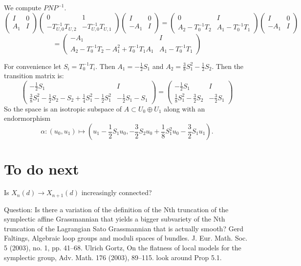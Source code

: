 {We compute $P N P^{-1}$.
$$
  \begin{pmatrix}
     I & 0\\
    A_1 &      I   \end{pmatrix}
  \begin{pmatrix}
  0 & 1 \\
 -T^{-1}_{U,0}T_{U,2} & -T^{-1}_{U,0}T_{U,1} 
  \end{pmatrix}
  \begin{pmatrix}
     I & 0 \\
    -A_1 &      I   \end{pmatrix} =
  \begin{pmatrix}
    0 & I \\
A_2 - T_0^{-1} T_2 & A_1 - T_0^{-1} T_1 
  \end{pmatrix}
  \begin{pmatrix}
     I & 0 \\
    -A_1 &      I   \end{pmatrix}  
  $$
  $$
  = \begin{pmatrix}
    -A_1 & I \\
A_2 - T_0^{-1} T_2 - A_1^2 + T_0^{-1} T_1 A_1    & A_1 - T_0^{-1} T_1
  \end{pmatrix}
  $$

  For convenience let $S_i = T_0^{-1} T_i$.
  Then $A_1 = - \frac 1 2 S_1$ and $A_2 = \frac 3 8 S_1^2 - \frac 1 2 S_2$.
  Then the transition matrix is:
 $$
 \begin{pmatrix}
    - \frac 1 2 S_1  & I \\ 
    \frac 3 8 S_1^2 - \frac 1 2 S_2 - S_2 + \frac 1 4 S_1^2 - \frac 1 2 S_1^2 & - \frac 1 2 S_1 - S_1 
 \end{pmatrix}
 = 
 \begin{pmatrix}
    - \frac 1 2 S_1  & I \\ 
    \frac 1 8 S_1^2 - \frac 3 2 S_2 &  - \frac 3 2 S_1
 \end{pmatrix}
 $$
 So the space is an isotropic subspace of $A \subset U_0 \oplus U_1$ along with an endormorphism
 $$\alpha:  (u_0, u_1) \mapsto (u_1 -\frac 1 2 S_1 u_0, -\frac 3 2 S_2 u_0 + \frac 1 8 S_1^2 u_0 - \frac 3 2 S_1 u_1).
$$
 
\section{To do next}


Is $X_n(d) \rightarrow X_{n+1}(d)$ increasingly connected?


Question: Is there a variation of the definition of the Nth truncation of the symplectic affine Grassmannian that yields a bigger subvariety of the Nth truncation of the Lagrangian Sato Grassmannian that is actually smooth?
Gerd Faltings, Algebraic loop groups and moduli spaces of bundles. J. Eur. Math. Soc. 5 (2003), no. 1, pp. 41–68.
Ulrich Gortz, On the flatness of local models for the symplectic group, Adv. Math. 176 (2003), 89–115. look around Prop 5.1.

}  %


